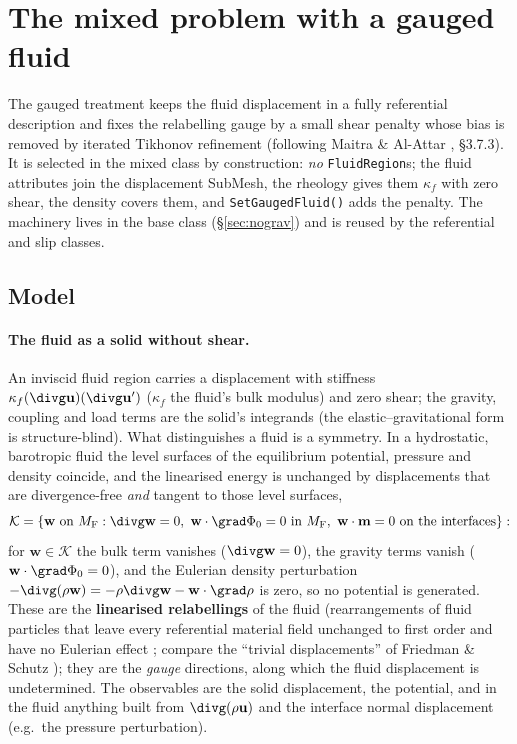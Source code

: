 \documentclass[11pt]{article}
\numberwithin{equation}{section}
\theoremstyle{remark}
\newcommand{\vu}{\mathbf{u}}
\newcommand{\vw}{\mathbf{w}}
\newcommand{\vm}{\mathbf{m}}
\newcommand{\MF}{M_{\mathrm{F}}}
\newcommand{\code}[1]{\texttt{#1}}
\begin{document}
\section{The mixed problem with a gauged fluid}
\label{sec:gauged}

The gauged treatment keeps the fluid displacement in a fully referential
description and fixes the relabelling gauge by a small shear penalty whose
bias is removed by iterated Tikhonov refinement (following Maitra \&
Al-Attar \cite{MaitraAlAttar2024}, \S3.7.3). It is selected in the mixed
class by construction: \emph{no} \code{FluidRegion}s; the fluid attributes
join the displacement SubMesh, the rheology gives them $\kappa_f$ with zero
shear, the density covers them, and \code{SetGaugedFluid()} adds the
penalty. The machinery lives in the base class
(\S\ref{sec:nograv}) and is reused by the referential and slip classes.

\subsection{Model}

\paragraph{The fluid as a solid without shear.} An inviscid fluid region
carries a displacement with stiffness $\kappa_f(\divg\vu)(\divg\vu')$
($\kappa_f$ the fluid's bulk modulus) and zero shear; the gravity, coupling
and load terms are the solid's integrands (the elastic--gravitational form
is structure-blind). What distinguishes a fluid is a symmetry. In a
hydrostatic, barotropic fluid the level surfaces of the equilibrium
potential, pressure and density coincide, and the linearised energy is
unchanged by displacements that are divergence-free \emph{and} tangent to
those level surfaces,
\begin{equation}
  \mathcal{K} = \{\vw \text{ on } \MF : \divg\vw = 0,\
               \vw\cdot\grad\Phi_0 = 0 \text{ in } \MF,\
               \vw\cdot\vm = 0 \text{ on the interfaces}\}:
  \label{eq:relabelK}
\end{equation}
for $\vw\in\mathcal{K}$ the bulk term vanishes ($\divg\vw = 0$), the
gravity terms vanish ($\vw\cdot\grad\Phi_0 = 0$), and the Eulerian density
perturbation $-\divg(\rho\vw) = -\rho\divg\vw - \vw\cdot\grad\rho$ is zero,
so no potential is generated. These are the \textbf{linearised
relabellings} of the fluid (rearrangements of fluid particles that leave
every referential material field unchanged to first order and have no
Eulerian effect \cite{AlAttarCrawford2016}; compare the ``trivial
displacements'' of Friedman \& Schutz \cite{FriedmanSchutz1978}); they are
the \emph{gauge} directions, along which the fluid displacement is
undetermined. The observables are the solid displacement, the potential,
and in the fluid anything built from $\divg(\rho\vu)$ and the interface
normal displacement (e.g.\ the pressure perturbation).
\end{document}
